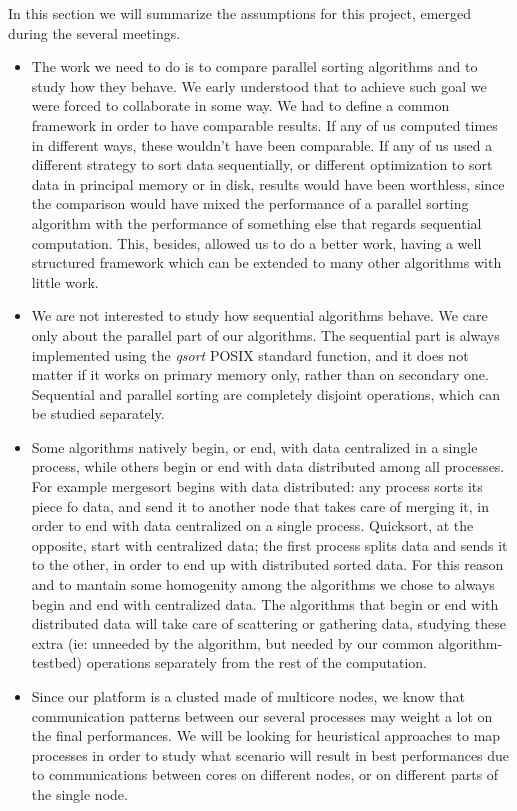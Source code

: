 In this section we will summarize the assumptions for this project, emerged during the several meetings.
\begin{itemize}
	\item{The work we need to do is to compare parallel sorting algorithms and to study how they behave. We early understood that to achieve such goal we were forced to collaborate in some way. We had to define a common framework in order to have comparable results. If any of us computed times in different ways, these wouldn't have been comparable. If any of us used a different strategy to sort data sequentially, or different optimization to sort data in principal memory or in disk, results would have been worthless, since the comparison would have mixed the performance of a parallel sorting algorithm with the performance of something else that regards sequential computation. This, besides, allowed us to do a better work, having a well structured framework which can be extended to many other algorithms with little work.}
	\item{We are not interested to study how sequential algorithms behave. We care only about the parallel part of our algorithms. The sequential part is always implemented using the \textit{qsort} POSIX standard function, and it does not matter if it works on primary memory only, rather than on secondary one. Sequential and parallel sorting are completely disjoint operations, which can be studied separately.}
	\item{Some algorithms natively begin, or end, with data centralized in a single process, while others begin or end with data distributed among all processes. For example mergesort begins with data distributed: any process sorts its piece fo data, and send it to another node that takes care of merging it, in order to end with data centralized on a single process. Quicksort, at the opposite, start with centralized data; the first process splits data and sends it to the other, in order to end up with distributed sorted data. For this reason and to mantain some homogenity among the algorithms we chose to always begin and end with centralized data. The algorithms that begin or end with distributed data will take care of scattering or gathering data, studying these extra (ie: unneeded by the algorithm, but needed by our common algorithm-testbed) operations separately from the rest of the computation.}
	\item{Since our platform is a clusted made of multicore nodes, we know that communication patterns between our several processes may weight a lot on the final performances. We will be looking for heuristical approaches to map processes in order to study what scenario will result in best performances due to communications between cores on different nodes, or on different parts of the single node.}
\end{itemize}
